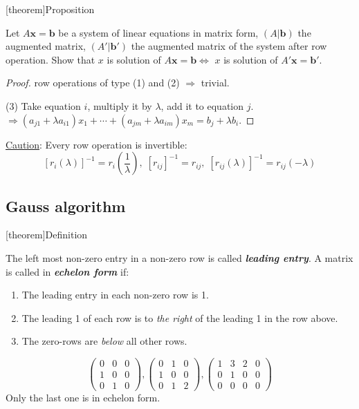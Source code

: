 \documentclass[12pt]{report}
\theoremstyle{definition}
\begin{document}
[theorem]{Proposition}
\begin{row operation on augmented matrix}
    Let $A\pmb{x} = \pmb{b}$ be a system of linear equations in matrix form, $(A|\pmb{b})$
    the augmented matrix, $(A'|\pmb{b}')$ the augmented matrix of the system after row operation.
    Show that $x$ is solution of $A\pmb{x} = \pmb{b} \iff$ $x$ is solution of $A'\pmb{x} = \pmb{b}'$.
\end{row operation on augmented matrix}

\begin{proof}
    row operations of type (1) and (2) $\Rightarrow$ trivial.%

    (3) Take equation $i$, multiply it by $\lambda$, add it to equation $j$.
    $\Rightarrow (a_{j1} + \lambda a_{i 1}) x_1 + \cdots + (a_{jm} + \lambda a_{im})x_m = b_j + \lambda b_i$.
\end{proof}
\underline{Caution}: Every row operation is invertible: \[
    {[r_i(\lambda)]}^{-1} = r_i(\frac{1}{\lambda}),\; {[r_{ij}]}^{-1} = r_{ij},\;
    {[r_{ij}(\lambda)]}^{-1} = r_{ij}(-\lambda)
\]

\subsection{Gauss algorithm}
[theorem]{Definition}
\begin{echelon form}
    The left most non-zero entry in a non-zero row is called \textbf{\emph{leading entry}}.
    A matrix is called in \textbf{\emph{echelon form}} if:
    \begin{enumerate}[label = (\arabic*)]
        \item The leading entry in each non-zero row is 1.
        \item The leading 1 of each row is to \emph{the right} of the leading 1 in the row above.
        \item The zero-rows are \emph{below} all other rows.
    \end{enumerate}
\end{echelon form}

\begin{ex}
    \[
        \begin{pmatrix}
            0 & 0 & 0 \\
            1 & 0 & 0 \\
            0 & 1 & 0
        \end{pmatrix}, \begin{pmatrix}
        0 & 1 & 0\\
        1 & 0 & 0\\
        0 & 1 & 2
        \end{pmatrix}, \begin{pmatrix}
        1 & 3 & 2 & 0\\
        0 & 1 & 0 & 0\\
        0 & 0 & 0 & 0
        \end{pmatrix} 
    \]
    Only the last one is in echelon form.
\end{ex}
\end{document}
